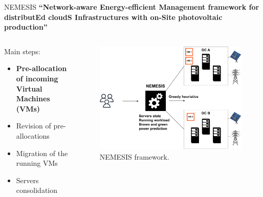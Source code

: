 \documentclass[Ligatures=TeX,table,svgnames,usetotalslideindicator,compress,10pt,aspectratio=169]{beamer}
\begin{document}
\begin{frame}{NEMESIS}
  \textbf {``\alert{N}etwork-aware \alert{E}nergy-efficient
    \alert{M}anagement framework for distribut\alert{E}d
    cloud\alert{S} \alert{I}nfrastructures with on-\alert{S}ite
    photovoltaic production''}  
  \begin{columns}        
    \begin{column}{0.4\textwidth}
Main steps:
\small
\begin{itemize}
    \item \alert{\textbf{Pre-allocation of incoming Virtual Machines (VMs)}}
    \item Revision of pre-allocations
    \item Migration of the running VMs
    \item Servers consolidation
\end{itemize}
\end{column}   

\begin{column}{0.6\textwidth}
      \begin{figure}[!h]
        \centering
        \includegraphics[width=.85\textwidth]{images/nemesis_pre_aloc_2.pdf}
        \caption{NEMESIS framework.}
      \end{figure}
    \end{column}        

\end{columns}
\end{frame}
\end{document}
